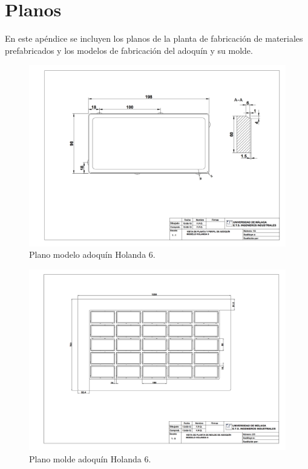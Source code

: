 \chapter{Planos}\label{apend:planos}
En este apéndice se incluyen los planos de la planta de fabricación de materiales prefabricados y los modelos de fabricación del adoquín y su molde.

\newpage

\begin{figure}[!htb]
\centering
\includegraphics[angle=90,width=13.5cm]{plano_adoquin.png}
\caption{Plano modelo adoquín Holanda 6.}
\label{fig:planoadoquin}
\end{figure}

\newpage

\begin{figure}[!htb]
\centering
\includegraphics[angle=90,width=13.5cm]{plano_molde.png}
\caption{Plano molde adoquín Holanda 6.}
\label{fig:planomolde}
\end{figure}

